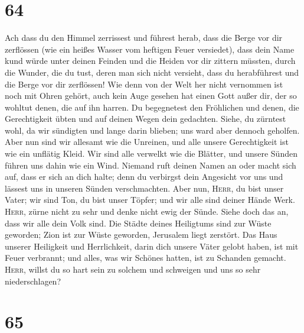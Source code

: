 \hypertarget{section-63}{%
\section{64}\label{section-63}}

 Ach dass du den Himmel zerrissest und führest herab, dass
die Berge vor dir zerflössen (wie ein heißes Wasser vom heftigen Feuer
versiedet), dass dein Name kund würde unter deinen Feinden und die
Heiden vor dir zittern müssten,  durch die Wunder, die du
tust, deren man sich nicht versieht, dass du herabführest und die Berge
vor dir zerflössen!  Wie denn von der Welt her nicht
vernommen ist noch mit Ohren gehört, auch kein Auge gesehen hat einen
Gott außer dir, der so wohltut denen, die auf ihn harren. 
Du begegnetest den Fröhlichen und denen, die Gerechtigkeit übten und auf
deinen Wegen dein gedachten. Siehe, du zürntest wohl, da wir sündigten
und lange darin blieben; uns ward aber dennoch geholfen. 
Aber nun sind wir allesamt wie die Unreinen, und alle unsere
Gerechtigkeit ist wie ein unflätig Kleid. Wir sind alle verwelkt wie die
Blätter, und unsere Sünden führen uns dahin wie ein Wind. 
Niemand ruft deinen Namen an oder macht sich auf, dass er sich an dich
halte; denn du verbirgst dein Angesicht vor uns und lässest uns in
unseren Sünden verschmachten.  Aber nun, \textsc{Herr}, du
bist unser Vater; wir sind Ton, du bist unser Töpfer; und wir alle sind
deiner Hände Werk.  \textsc{Herr}, zürne nicht zu sehr und
denke nicht ewig der Sünde. Siehe doch das an, dass wir alle dein Volk
sind.  Die Städte deines Heiligtums sind zur Wüste
geworden; Zion ist zur Wüste geworden, Jerusalem liegt zerstört.
 Das Haus unserer Heiligkeit und Herrlichkeit, darin dich
unsere Väter gelobt haben, ist mit Feuer verbrannt; und alles, was wir
Schönes hatten, ist zu Schanden gemacht.  \textsc{Herr},
willst du so hart sein zu solchem und schweigen und uns so sehr
niederschlagen?

\hypertarget{section-64}{%
\section{65}\label{section-64}}

